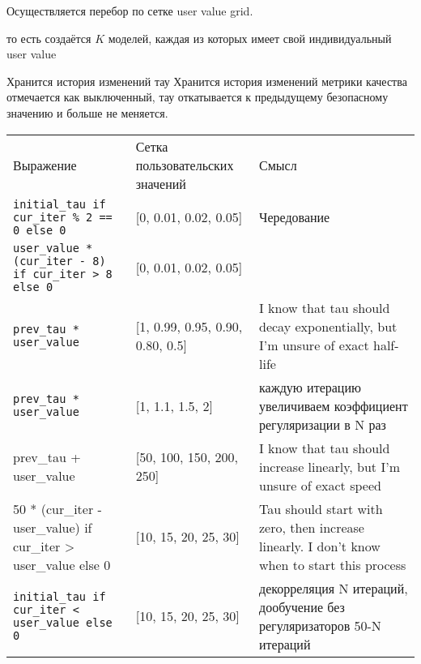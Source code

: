 Осуществляется перебор по сетке
user value grid.

то есть создаётся $K$ моделей, каждая из которых имеет свой индивидуальный user value

Хранится история изменений тау
Хранится история изменений метрики качества
отмечается как выключенный, тау откатывается к предыдущему безопасному значению и больше не меняется.


\begin{table}[]
\begin{tabular}{lll}
Выражение                                                      & Сетка пользовательских значений  & Смысл                                                                                       \\
\texttt{initial\_tau if cur\_iter \% 2 == 0 else 0}            & [0, 0.01, 0.02, 0.05]            & Чередование                                                                                 \\
\texttt{user\_value * (cur\_iter - 8) if cur\_iter > 8 else 0} & [0, 0.01, 0.02, 0.05]            &                                                                                             \\
\texttt{prev\_tau * user\_value}                               & [1, 0.99, 0.95, 0.90, 0.80, 0.5] & I know that tau should decay exponentially, but I'm unsure of exact half-life               \\
\texttt{prev\_tau * user\_value}                               & [1, 1.1, 1.5, 2]                 & каждую итерацию увеличиваем коэффициент регуляризации в N раз                               \\
prev_tau + user_value                                          & [50, 100, 150, 200, 250]         & I know that tau should increase linearly, but I'm unsure of exact speed                     \\
50 * (cur_iter - user_value) if cur_iter > user_value else 0   & [10, 15, 20, 25, 30]             & Tau should start with zero, then increase linearly. I don't know when to start this process \\
\texttt{initial\_tau if cur\_iter < user\_value else 0}        & [10, 15, 20, 25, 30]             & декорреляция N итераций, дообучение без регуляризаторов 50-N итераций                      
\end{tabular}
\end{table}







